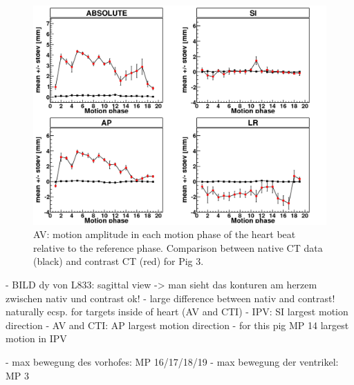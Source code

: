 \documentclass[type=dr, dr=rernat, accentcolor=tud7b,colorbacktitle, bigchapter, openright, twoside, 12pt ]{tudthesis}
\begin{document}

\begin{figure}[H]
\begin{center}
 \includegraphics[scale=0.22]{Mayo_AV_NATIV_VS_HB_CONTRAST.png}
\caption{AV: motion amplitude in each motion phase of the heart beat relative to the reference phase. Comparison between native CT data 
(black) and contrast CT (red) for Pig 3.}
\end{center}
\label{motion_hb_av_contrast_nativ}
\end{figure}

- BILD dy von L833: sagittal view -> man sieht das konturen am herzem zwischen nativ und contrast ok!
- large difference between nativ and contrast! naturally ecsp. for targets inside of heart (AV and CTI) \newline 
- IPV: SI largest motion direction \newline
- AV and CTI: AP largest motion direction \newline
- for this pig MP 14 largest motion in IPV \newline

- max bewegung des vorhofes: MP 16/17/18/19
- max bewegung der ventrikel: MP 3
\end{document}
